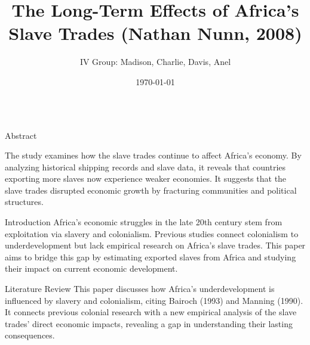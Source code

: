 \documentclass[final]{beamer}
\title{\Huge The Long-Term Effects of Africa's Slave Trades (Nathan Nunn, 2008)} %
\author{\Large IV Group: Madison, Charlie, Davis, Anel}
\institute{\Large Texas A\&M University} %
\date{\Large\today} %
\begin{document}
\begin{frame}[t]

\begin{block}{}
\centering
\maketitle
\end{block}

\begin{columns}[T] %

\begin{column}{.32\textwidth}
    \begin{block}{\Huge Abstract} %


    \Large %
    The study examines how the slave trades continue to affect Africa's economy. By analyzing historical shipping records and slave data, it reveals that countries exporting more slaves now experience weaker economies. It suggests that the slave trades disrupted economic growth by fracturing communities and political structures.
    \end{block}

    \vspace{1cm} %

    \begin{block}{\Huge Introduction} %
    \Large %
     Africa's economic struggles in the late 20th century stem from exploitation via slavery and colonialism. Previous studies connect colonialism to underdevelopment but lack empirical research on Africa's slave trades. This paper aims to bridge this gap by estimating exported slaves from Africa and studying their impact on current economic development.
    \end{block}

    \vspace{1cm} %

    \begin{block}{\Huge Literature Review} %
    \Large %
    This paper discusses how Africa's underdevelopment is influenced by slavery and colonialism, citing Bairoch (1993) and Manning (1990). It connects previous colonial research with a new empirical analysis of the slave trades' direct economic impacts, revealing a gap in understanding their lasting consequences.
    \end{block}
\end{column}


\end{columns}
\end{frame}
\end{document}
